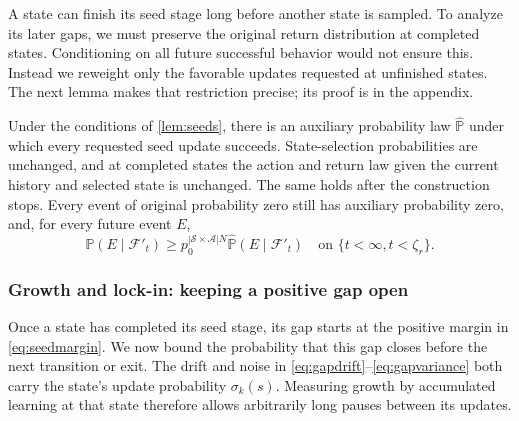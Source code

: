 A state can finish its seed stage long before another state is sampled. To analyze its later gaps, we must preserve the original return distribution at completed states. Conditioning on all future successful behavior would not ensure this. Instead we reweight only the favorable updates requested at unfinished states. The next lemma makes that restriction precise; its proof is in the appendix.

\begin{lemma}
\label{lem:measure}
Under the conditions of \autoref{lem:seeds}, there is an auxiliary probability law $\widehat{\mathbb P}$ under which every requested seed update succeeds. State-selection probabilities are unchanged, and at completed states the action and return law given the current history and selected state is unchanged. The same holds after the construction stops. Every event of original probability zero still has auxiliary probability zero, and, for every future event $E$,
\begin{equation}
\label{eq:transfer}
\mathbb P(E\mid\mathcal F'_t)
\ge p_0^{|\mathcal S\times\mathcal A|N}\widehat{\mathbb P}(E\mid\mathcal F'_t)
\quad\text{on }\{t<\infty,t<\zeta_r\}.
\end{equation}
\end{lemma}

\subsubsection{Growth and lock-in: keeping a positive gap open}
Once a state has completed its seed stage, its gap starts at the positive margin in \eqref{eq:seedmargin}. We now bound the probability that this gap closes before the next transition or exit. The drift and noise in \eqref{eq:gapdrift}--\eqref{eq:gapvariance} both carry the state's update probability $\sigma_k(s)$. Measuring growth by accumulated learning at that state therefore allows arbitrarily long pauses between its updates.


